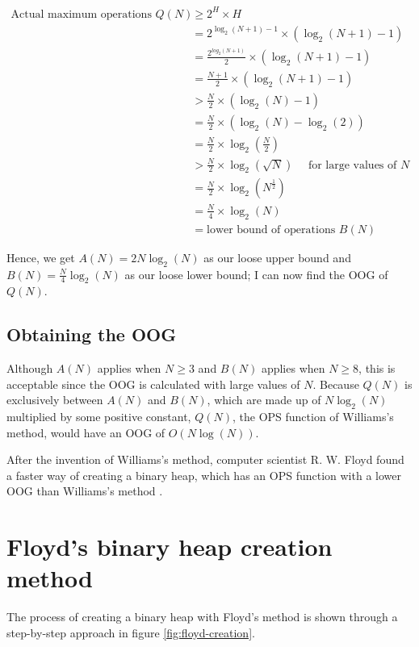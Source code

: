 \documentclass[12pt]{article}
\begin{document}
\bgroup
\onehalfspacing
\allowdisplaybreaks
\begin{align*}
    \text{Actual maximum operations }Q(N)&\geq2^H\times H\\
    &=2^{\log_2(N+1)-1}\times (\log_2(N+1)-1)\\
    &=\frac{2^{log_2(N+1)}}{2}\times (\log_2(N+1)-1)\\
    &=\frac{N+1}{2}\times (\log_2(N+1)-1)\\
    &>\frac{N}{2}\times (\log_2(N)-1)\\
    &=\frac{N}{2}\times (\log_2(N)-\log_2(2))\\
    &=\frac{N}{2}\times \log_2(\frac{N}{2})\\
    &>\frac{N}{2}\times \log_2(\sqrt{N})\quad\text{ for large values of } N\\
    &=\frac{N}{2}\times \log_2(N^{\frac{1}{2}})\\
    &=\frac{N}{4}\times \log_2(N)\\
    &=\text{lower bound of operations }B(N)
\end{align*}
\egroup

Hence, we get $A(N)=2N\log_2(N)$ as our loose upper bound and $B(N)=\frac{N}{4}\log_2(N)$ as our loose lower bound; I can now find the OOG of $Q(N)$.

\subsection{Obtaining the OOG}\label{williams_OOG}
Although $A(N)$ applies when $N\geq 3$ and $B(N)$ applies when $N\geq8$, this is acceptable since the OOG is calculated with large values of $N$. Because $Q(N)$ is exclusively between $A(N)$ and $B(N)$, which are made up of $N\log_2(N)$ multiplied by some positive constant, $Q(N)$, the OPS function of Williams's method, would have an OOG of $O(N\log(N))$.\newline

After the invention of Williams's method, computer scientist R. W. Floyd found a faster way of creating a binary heap, which has an OPS function with a lower OOG than Williams’s method \parencite[58]{JCC}.

\section{Floyd's binary heap creation method}
The process of creating a binary heap with Floyd’s method is shown through a step-by-step approach in figure \ref{fig:floyd-creation}.
\end{document}
